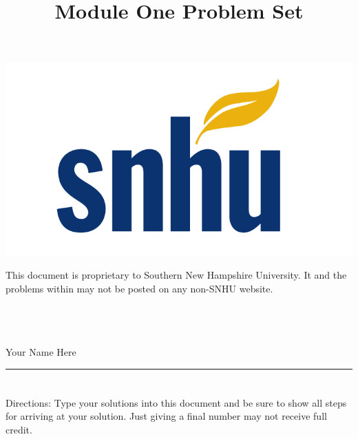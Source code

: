 \documentclass{amsart}
\theoremstyle{definition}
\theoremstyle{Exercise}
\theoremstyle{remark}
\theoremstyle{rule}
\numberwithin{equation}{section}
\begin{document}
\title{\sf Module One Problem Set}%





\begin{center}
\includegraphics[scale=.1]{snhu_logo.png}
\end{center}

\maketitle 
This document is proprietary to Southern New Hampshire University. It and the problems within may not be posted on any non-SNHU website.
\\\\\\\\
\begin{center}
Your Name Here
\end{center}

\begin{center}
\rule{\textwidth}{0.4pt}
\end{center}
\newpage


\section*{}


\section*{}
Directions: Type your solutions into this document and be sure to show all steps for arriving at your solution. Just giving a final number may not receive full credit.
\\
\end{document}

